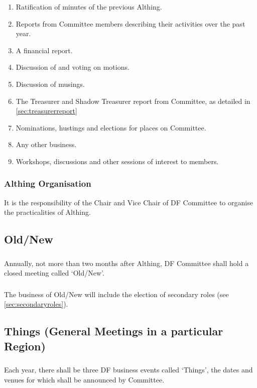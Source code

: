 \documentclass[a4paper, 11pt]{report}
\begin{document}
\begin{enumerate}
\item Ratification of minutes of the previous Althing.
\item Reports from Committee members describing their activities over the past year.
\item A financial report.
\item Discussion of and voting on motions.
\item Discussion of musings.
\item The Treasurer and Shadow Treasurer report from Committee, as detailed in \ref{sec:treasurerreport}
\item Nominations, hustings and elections for places on Committee.
\item Any other business.
\item Workshops, discussions and other sessions of interest to members.
\end{enumerate}

\subsubsection{Althing Organisation}
It is the responsibility of the Chair and Vice Chair of DF Committee to organise the practicalities of Althing.


\subsection{Old/New}
\label{sec:oldnew}
\subsubsection{} Annually, not more than two months after Althing, DF Committee shall hold a closed meeting called `Old/New'.

\subsubsection{} The business of Old/New will include the election of secondary roles (see \ref{sec:secondaryroles}).

\subsection{Things (General Meetings in a particular Region)}
\subsubsection{}
Each year, there shall be three DF business events called `Things', the dates and venues for which shall be announced by Committee.
\end{document}
